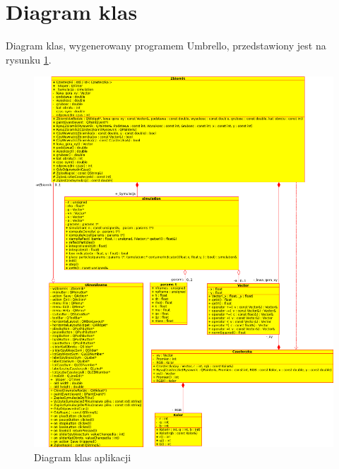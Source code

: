 \section{Diagram klas}
Diagram klas, wygenerowany programem \textsf{Umbrello}, przedstawiony jest na rysunku \ref{fig:diagram_klas}.

\begin{figure}
 \begin{center}
  \includegraphics[width=\textwidth] {rysunki/class_diagram}
 \end{center}
 \caption{Diagram klas aplikacji}
 \label{fig:diagram_klas}
\end{figure}

